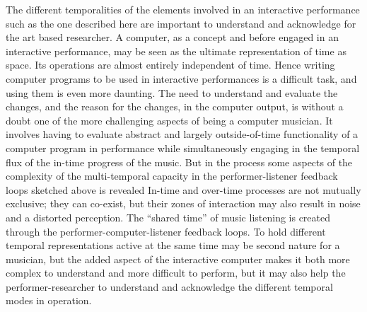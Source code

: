 The different temporalities of the elements involved in an interactive performance such as the one described here are important to understand and acknowledge for the art based researcher. A computer, as a concept and before engaged in an interactive performance, may be seen as the ultimate representation of time as space. Its operations are almost entirely independent of time. Hence writing computer programs to be used in interactive performances is a difficult task, and using them is even more daunting. The need to understand and evaluate the changes, and the reason for the changes, in the computer output, is without a doubt one of the more challenging aspects of being a computer musician. It involves having to evaluate abstract and largely outside-of-time functionality of a computer program in performance while simultaneously engaging in the temporal flux of the in-time progress of the music. But in the process some aspects of the complexity of the multi-temporal capacity in the performer-listener feedback loops sketched above is revealed
In-time and over-time processes are not mutually exclusive; they can co-exist, but their zones of interaction may also result in noise and a distorted perception. The ``shared time'' of music listening is created through the performer-computer-listener feedback loops. To hold different temporal representations active at the same time may be second nature for a musician, but the added aspect of the interactive computer makes it both more complex to understand and more difficult to perform, but it may also help the performer-researcher to understand and acknowledge the different temporal modes in operation. %


